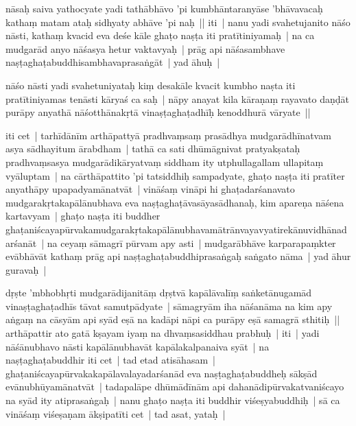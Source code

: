 \documentclass[article,12pt,a4paper]{memoir}%
\newcounter{parCount}
\begin{document}
	  \pstart \leavevmode%
	nāsaḥ saiva yathocyate yadi tathābhāvo 'pi kumbhāntaranyāse 'bhāvavacaḥ kathaṃ matam ataḥ sidhyaty abhāve 'pi naḥ || iti |  \label{thakur75-119.16} nanu yadi svahetujanito nāśo nāsti, kathaṃ kvacid eva deśe kāle ghaṭo naṣṭa iti pratītiniyamaḥ | na ca mudgarād anyo nāśasya hetur vaktavyaḥ | prāg api nāśasambhave naṣṭaghaṭabuddhisambhavaprasaṅgāt | yad āhuḥ |
	{}
	\pend%
      

	  \pstart \leavevmode%
	nāśo nāsti yadi svahetuniyataḥ kiṃ desakāle kvacit kumbho naṣta iti pratītiniyamas tenāsti kāryaś ca saḥ | nāpy anayat kila kāraṇaṃ rayavato daṇḍāt purāpy anyathā nāśotthānakṛtā vinaṣṭaghaṭadhīḥ kenoddhurā vāryate || 
	{}
	\pend%
      

	  \pstart \leavevmode%
	iti cet | \label{thakur75-119.23} tarhīdānīm arthāpattyā pradhvaṃsaṃ prasādhya mudgarādhīnatvam asya sādhayitum ārabdham | tathā ca sati dhūmāgnivat pratyakṣataḥ pradhvaṃsasya mudgarādikāryatvaṃ siddham ity utphullagallam ullapitaṃ vyāluptam | \label{thakur75-119.26} na cārthāpattito 'pi tatsiddhiḥ sampadyate, ghaṭo naṣṭa iti pratīter anyathāpy upapadyamānatvāt | vināśaṃ vināpi hi ghaṭadarśanavato mudgarakṛtakapālānubhava eva naṣṭaghaṭāvasāyasādhanaḥ, kim apareṇa nāśena kartavyam | ghaṭo naṣṭa iti buddher ghaṭaniścayapūrvakamudgarakṛtakapālānubhavamātrānvayavyatirekānuvidhānadarśanāt | \label{thakur75-119.29} na ceyaṃ sāmagrī pūrvam apy asti | mudgarābhāve karparapaṃkter evābhāvāt kathaṃ prāg api naṣṭaghaṭabuddhiprasaṅgaḥ saṅgato nāma | \label{thakur75-119.31} yad āhur guravaḥ |
	{}
	\pend%
      

	  \pstart \leavevmode%
	dṛṣte 'mbhobhṛti mudgarādijanitāṃ dṛṣtvā kapālāvalīṃ saṅketānugamād vinaṣṭaghaṭadhīs tāvat samutpādyate | sāmagryām iha nāśanāma na kim apy aṅgaṃ na cāsyām api syād eṣā na kadāpi nāpi ca purāpy eṣā samagrā sthitiḥ || arthāpattir ato gatā kṣayam iyaṃ na dhvaṃsasiddhau prabhuḥ | iti |  \label{thakur75-120.4} yadi nāśānubhavo nāsti kapālānubhavāt kapālakalpanaiva syāt | na naṣṭaghaṭabuddhir iti cet | \label{thakur75-120.5} tad etad atisāhasam | ghaṭaniścayapūrvakakapālavalayadarśanād eva naṣṭaghaṭabuddheḥ sākṣād evānubhūyamānatvāt | tadapalāpe dhūmādīnām api dahanādipūrvakatvaniścayo na syād ity atiprasaṅgaḥ | \label{thakur75-120.8} nanu ghaṭo naṣṭa iti buddhir viśeṣyabuddhiḥ | sā ca vināśaṃ viśeṣaṇam ākṣipatīti cet | \label{thakur75-120.9} tad asat, yataḥ |
	{}
	\pend%
      
\end{document}
